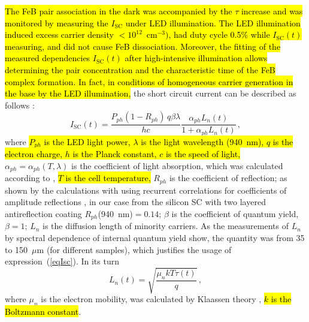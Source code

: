 \documentclass[sn-mathphys]{sn-jnl}%
\theoremstyle{thmstyleone}%
\theoremstyle{thmstyletwo}%
\theoremstyle{thmstylethree}%
\begin{document}
\hl{The FeB pair association in the dark was accompanied by the $\tau$ increase and
was monitored by measuring the $I_\mathrm{SC}$ under LED illumination.
The LED illumination induced excess carrier density $<10^{12}$~cm$^{-3})$,
had duty cycle 0.5\% while $I_\mathrm{SC}(t)$ measuring,
and did not cause FeB dissociation.
Moreover, the fitting of the measured dependencies $I_\mathrm{SC}(t)$ after high-intensive illumination
allows determining  the pair concentration and the characteristic time of the FeB complex formation.
In fact, in conditions of homogeneous carrier generation in the base  by the LED illumination,}
the short circuit current can be described as follows \cite{Bube,Razeghi}:
\begin{equation}
\label{eqIsc}
I_\mathrm{SC}(t)=\frac{P_{ph}(1-R_{ph})\,q\beta\lambda}{hc}\frac{\alpha_{ph}L_n(t)}{1+\alpha_{ph}L_n(t)}\,,
\end{equation}
where
\hl{$P_{ph}$ is the LED light power,
$\lambda$ is the light wavelength (940~nm),
$q$ is the electron charge,
$h$ is the Planck constant,
$c$ is the speed of light,}
$\alpha_{ph}=\alpha_{ph}(T,\lambda)$ is the coefficient of light absorption,
which was calculated according to \cite{Si:Absorb,GreenOptic},
\hl{$T$ is the cell temperature,}
$R_{ph}$ is the coefficient of reflection;
as shown by the calculations with using recurrent correlations for coefficients of amplitude reflections \cite{KostRefl2000,KostRefl2000A},
in our case from the silicon SC with two layered antireflection coating $R_{ph}$(940~nm)$=0.14$;
$\beta$ is the coefficient of quantum  yield, $\beta=1$;
$L_n$  is the diffusion length of minority carriers.
As the measurements of $L_n$ by spectral dependence of internal quantum yield show,
the quantity was from 35 to 150~$\mu$m (for different samples),
which justifies the usage of expression~(\ref{eqIsc}).
In its turn
\begin{equation}
\label{eqLn}
L_n(t)=\sqrt{\frac{\mu_nkT\tau(t)}{q}}\,,
\end{equation}
where
$\mu_n$ is the electron mobility, was calculated by Klaassen theory \cite{KLAASSEN953},
\hl{$k$ is the Boltzmann constant}.
\end{document}

